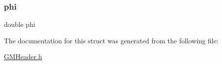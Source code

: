 \mbox{\label{struct_g_mtype___coord_geodetic_adae8d8a6ff28515e505bb1c07f2b33c8}} 
\subsubsection{\texorpdfstring{phi}{phi}}
{\footnotesize\ttfamily double phi}



The documentation for this struct was generated from the following file\+:\begin{DoxyCompactItemize}
\item 
\mbox{\hyperlink{_g_m_header_8h}{G\+M\+Header.\+h}}\end{DoxyCompactItemize}

